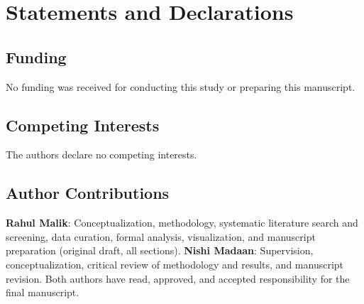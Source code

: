\documentclass[pdflatex,sn-mathphys-num]{sn-jnl}
\begin{document}

\maketitle




















\section*{Statements and Declarations}

\subsection*{Funding}
No funding was received for conducting this study or preparing this manuscript.

\subsection*{Competing Interests}
The authors declare no competing interests.

\subsection*{Author Contributions}
\textbf{Rahul Malik}: Conceptualization, methodology, systematic literature
search and screening, data curation, formal analysis, visualization, and
manuscript preparation (original draft, all sections).
\textbf{Nishi Madaan}: Supervision, conceptualization, critical review of
methodology and results, and manuscript revision.
Both authors have read, approved, and accepted responsibility for the final
manuscript.
\end{document}
